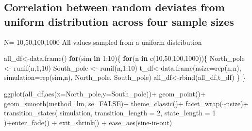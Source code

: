 \documentclass[
  letterpaper,
  DIV=11,
  numbers=noendperiod]{scrreprt}
\newenvironment{Shaded}{\begin{snugshade}}{\end{snugshade}}
\newcommand{\AttributeTok}[1]{\textcolor[rgb]{0.40,0.45,0.13}{#1}}
\newcommand{\ConstantTok}[1]{\textcolor[rgb]{0.56,0.35,0.01}{#1}}
\newcommand{\ControlFlowTok}[1]{\textcolor[rgb]{0.00,0.23,0.31}{\textbf{#1}}}
\newcommand{\DecValTok}[1]{\textcolor[rgb]{0.68,0.00,0.00}{#1}}
\newcommand{\FunctionTok}[1]{\textcolor[rgb]{0.28,0.35,0.67}{#1}}
\newcommand{\NormalTok}[1]{\textcolor[rgb]{0.00,0.23,0.31}{#1}}
\newcommand{\OtherTok}[1]{\textcolor[rgb]{0.00,0.23,0.31}{#1}}
\newcommand{\SpecialCharTok}[1]{\textcolor[rgb]{0.37,0.37,0.37}{#1}}
\newcommand{\StringTok}[1]{\textcolor[rgb]{0.13,0.47,0.30}{#1}}
\begin{document}
\subsection{Correlation between random deviates from uniform
distribution across four sample
sizes}\label{correlation-between-random-deviates-from-uniform-distribution-across-four-sample-sizes}

N= 10,50,100,1000 All values sampled from a uniform distribution

\begin{Shaded}
\begin{Highlighting}[]
\NormalTok{all\_df}\OtherTok{\textless{}{-}}\FunctionTok{data.frame}\NormalTok{()}
\ControlFlowTok{for}\NormalTok{(sim }\ControlFlowTok{in} \DecValTok{1}\SpecialCharTok{:}\DecValTok{10}\NormalTok{)\{}
  \ControlFlowTok{for}\NormalTok{(n }\ControlFlowTok{in} \FunctionTok{c}\NormalTok{(}\DecValTok{10}\NormalTok{,}\DecValTok{50}\NormalTok{,}\DecValTok{100}\NormalTok{,}\DecValTok{1000}\NormalTok{))\{}
\NormalTok{  North\_pole }\OtherTok{\textless{}{-}} \FunctionTok{runif}\NormalTok{(n,}\DecValTok{1}\NormalTok{,}\DecValTok{10}\NormalTok{)}
\NormalTok{  South\_pole }\OtherTok{\textless{}{-}} \FunctionTok{runif}\NormalTok{(n,}\DecValTok{1}\NormalTok{,}\DecValTok{10}\NormalTok{)}
\NormalTok{  t\_df}\OtherTok{\textless{}{-}}\FunctionTok{data.frame}\NormalTok{(}\AttributeTok{nsize=}\FunctionTok{rep}\NormalTok{(n,n),}
                   \AttributeTok{simulation=}\FunctionTok{rep}\NormalTok{(sim,n),}
\NormalTok{                                  North\_pole,}
\NormalTok{                                  South\_pole)}
\NormalTok{  all\_df}\OtherTok{\textless{}{-}}\FunctionTok{rbind}\NormalTok{(all\_df,t\_df)}
\NormalTok{  \}}
\NormalTok{\}}


\FunctionTok{ggplot}\NormalTok{(all\_df,}\FunctionTok{aes}\NormalTok{(}\AttributeTok{x=}\NormalTok{North\_pole,}\AttributeTok{y=}\NormalTok{South\_pole))}\SpecialCharTok{+}
  \FunctionTok{geom\_point}\NormalTok{()}\SpecialCharTok{+}
  \FunctionTok{geom\_smooth}\NormalTok{(}\AttributeTok{method=}\NormalTok{lm, }\AttributeTok{se=}\ConstantTok{FALSE}\NormalTok{)}\SpecialCharTok{+}
  \FunctionTok{theme\_classic}\NormalTok{()}\SpecialCharTok{+}
  \FunctionTok{facet\_wrap}\NormalTok{(}\SpecialCharTok{\textasciitilde{}}\NormalTok{nsize)}\SpecialCharTok{+}
  \FunctionTok{transition\_states}\NormalTok{(}
\NormalTok{    simulation,}
    \AttributeTok{transition\_length =} \DecValTok{2}\NormalTok{,}
    \AttributeTok{state\_length =} \DecValTok{1}
\NormalTok{  )}\SpecialCharTok{+}\FunctionTok{enter\_fade}\NormalTok{() }\SpecialCharTok{+} 
  \FunctionTok{exit\_shrink}\NormalTok{() }\SpecialCharTok{+}
  \FunctionTok{ease\_aes}\NormalTok{(}\StringTok{\textquotesingle{}sine{-}in{-}out\textquotesingle{}}\NormalTok{)}
\end{Highlighting}
\end{Shaded}
\end{document}
